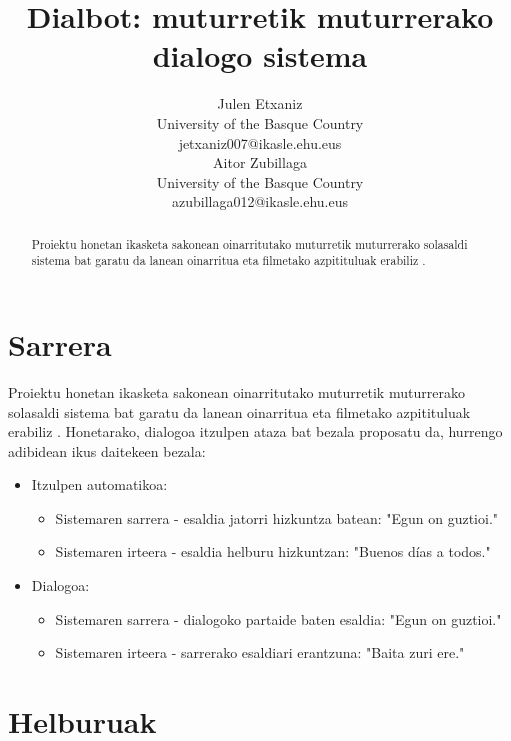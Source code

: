 \documentclass[11pt,a4paper]{article}
\title{Dialbot: muturretik muturrerako dialogo sistema}
\author{Julen Etxaniz \\
  University of the Basque Country \\
  jetxaniz007@ikasle.ehu.eus \\\And
  Aitor Zubillaga \\
  University of the Basque Country \\
  azubillaga012@ikasle.ehu.eus \\}
\date{}
\begin{document}
\maketitle

\begin{abstract}
Proiektu honetan ikasketa sakonean oinarritutako muturretik muturrerako solasaldi sistema bat garatu da \citep{bahdanau2014neural} lanean oinarritua eta filmetako azpitituluak erabiliz \citep{lison2016opensubtitles2016}.
\end{abstract}

\section{Sarrera}

Proiektu honetan ikasketa sakonean oinarritutako muturretik muturrerako solasaldi sistema bat garatu da \citep{bahdanau2014neural} lanean oinarritua eta filmetako azpitituluak erabiliz \citep{lison2016opensubtitles2016}. Honetarako, dialogoa itzulpen ataza bat bezala proposatu da, hurrengo adibidean ikus daitekeen bezala:

\begin{itemize}
   \item Itzulpen automatikoa:
   \begin{itemize}
     \item Sistemaren sarrera - esaldia jatorri hizkuntza batean: "Egun on guztioi."
     \item Sistemaren irteera - esaldia helburu hizkuntzan: "Buenos días a todos."
   \end{itemize}
   \item Dialogoa:
   \begin{itemize}
     \item Sistemaren sarrera - dialogoko partaide baten esaldia: "Egun on guztioi."
     \item Sistemaren irteera - sarrerako esaldiari erantzuna: "Baita zuri ere."
   \end{itemize}
\end{itemize}

\section{Helburuak}
\end{document}
